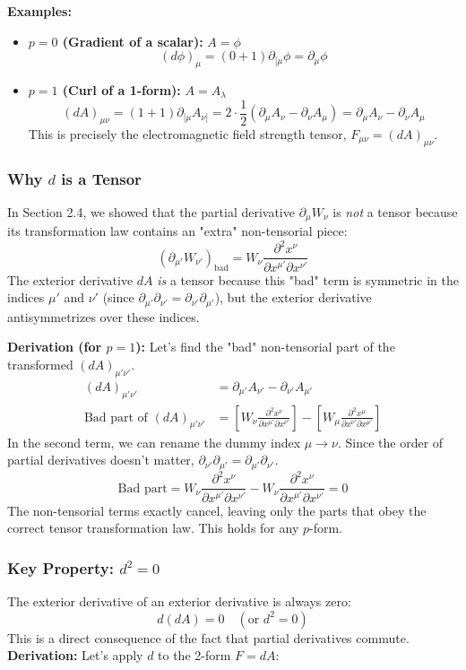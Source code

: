 \documentclass[11pt, a4paper]{report}
\begin{document}
\textbf{Examples:}
\begin{itemize}
    \item \textbf{$p=0$ (Gradient of a scalar):} $A = \phi$
    \[
        (d\phi)_\mu = (0+1) \partial_{[\mu} \phi = \partial_\mu \phi
    \]
    \item \textbf{$p=1$ (Curl of a 1-form):} $A = A_\lambda$
    \[
        (dA)_{\mu\nu} = (1+1) \partial_{[\mu} A_{\nu]} = 2 \cdot \frac{1}{2} (\partial_\mu A_\nu - \partial_\nu A_\mu) = \partial_\mu A_\nu - \partial_\nu A_\mu
    \]
    This is precisely the electromagnetic field strength tensor, $F_{\mu\nu} = (dA)_{\mu\nu}$.
\end{itemize}
\subsubsection*{Why $d$ is a Tensor}
In Section 2.4, we showed that the partial derivative $\partial_\mu W_\nu$ is \emph{not} a tensor because its transformation law contains an "extra" non-tensorial piece:
\[
    (\partial_{\mu'} W_{\nu'})_{\text{bad}} = W_\nu \frac{\partial^2 x^\nu}{\partial x^{\mu'} \partial x^{\nu'}}
\]
The exterior derivative $dA$ \emph{is} a tensor because this "bad" term is symmetric in the indices $\mu'$ and $\nu'$ (since $\partial_{\mu'} \partial_{\nu'} = \partial_{\nu'} \partial_{\mu'}$), but the exterior derivative antisymmetrizes over these indices.

\textbf{Derivation (for $p=1$):}
Let's find the "bad" non-tensorial part of the transformed $(dA)_{\mu'\nu'}$.
\begin{align*}
    (dA)_{\mu'\nu'} &= \partial_{\mu'} A_{\nu'} - \partial_{\nu'} A_{\mu'} \\
    \text{Bad part of } (dA)_{\mu'\nu'} &= \left[ W_\nu \frac{\partial^2 x^\nu}{\partial x^{\mu'} \partial x^{\nu'}} \right] - \left[ W_\mu \frac{\partial^2 x^\mu}{\partial x^{\nu'} \partial x^{\mu'}} \right]
\end{align*}
In the second term, we can rename the dummy index $\mu \to \nu$. Since the order of partial derivatives doesn't matter, $\partial_{\nu'} \partial_{\mu'} = \partial_{\mu'} \partial_{\nu'}$.
\[
    \text{Bad part} = W_\nu \frac{\partial^2 x^\nu}{\partial x^{\mu'} \partial x^{\nu'}} - W_\nu \frac{\partial^2 x^\nu}{\partial x^{\mu'} \partial x^{\nu'}} = 0
\]
The non-tensorial terms exactly cancel, leaving only the parts that obey the correct tensor transformation law. This holds for any $p$-form.

\subsubsection*{Key Property: $d^2 = 0$}
The exterior derivative of an exterior derivative is always zero:
\begin{equation}
    d(dA) = 0 \quad (\text{or } d^2 = 0)
\end{equation}
This is a direct consequence of the fact that partial derivatives commute.
\textbf{Derivation:}
Let's apply $d$ to the 2-form $F = dA$:
\end{document}
